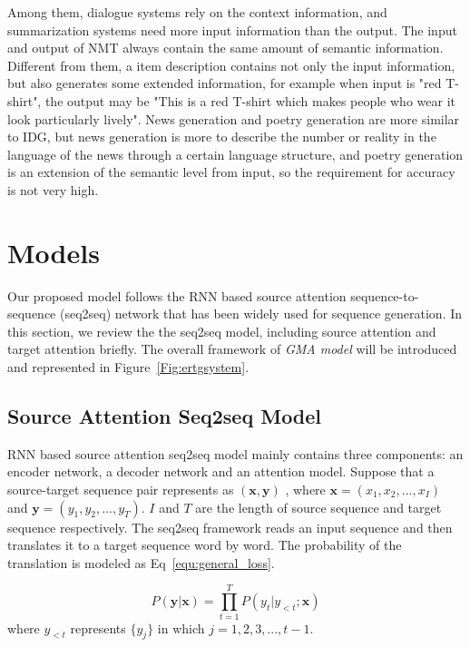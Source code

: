\documentclass[letterpaper]{article} %
\begin{document}
  Among them, dialogue systems rely on the context information, and summarization systems need more input information than the output. The input and output of NMT always contain the same amount of semantic information. Different from them, a item description contains not only the input information, but also generates some extended information, for example when input is "red T-shirt", the output may be "This is a red T-shirt which makes people who wear it look particularly lively". News generation and poetry generation are more similar to IDG, but news generation is more to describe the number or reality in the language of the news through a certain language structure, and poetry generation is an extension of the semantic level from input, so the requirement for accuracy is not very high.


\section{Models}

Our proposed model follows the RNN based source attention sequence-to-sequence (seq2seq) network that has been widely used for sequence generation. 
In this section, we review the the seq2seq model, including source attention and target attention briefly. The overall framework of \emph{GMA model} will be introduced and represented in Figure~\ref{Fig:ertgsystem}. 

\subsection{Source Attention Seq2seq Model}

RNN based source attention \cite{bahdanau2014neural} seq2seq model mainly contains three components:
 an encoder network,
 a decoder network and an attention model.
 Suppose that a source-target sequence pair represents as $(\textbf{x},\textbf{y})$ , where $ \textbf{x}=(x_1,x_2,...,x_I)$ and $ \textbf{y}=(y_1,y_2,...,y_T)$. $I$ and $T$ are the length of source sequence and target sequence respectively. 
 The seq2seq framework reads an input sequence and then translates it to a target sequence word by word. The probability of the translation is modeled as Eq~\eqref{equ:general_loss}. 

\begin{equation}
\label{equ:general_loss}
P(\textbf{y}|\textbf{x})=\prod^T_{t=1 }P(y_t|y_{<t};\textbf{x})
\end{equation}
where $y_{<t}$ represents $\{y_j\}$ in which $j=1,2,3,...,t-1$. 
\end{document}
